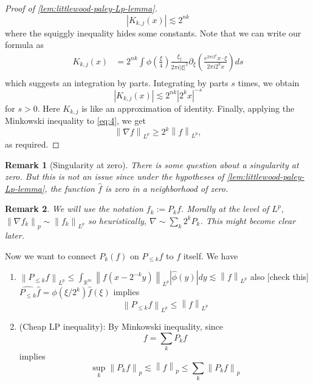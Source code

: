 \documentclass{article}
\def\red{\color{Red}}
\newcommand{\rnote}[1]{{\red [#1] }} %
\newtheorem{remark}{Remark}
\def\R{\mathbb{R}} %
\newcommand\norm[1]{\left\lVert#1\right\rVert}
\begin{document}
\begin{proof}[Proof of \cref{lem:littlewood-paley-Lp-lemma}]
\begin{equation*}
    \left| K_{k,j}(x) \right| \lesssim 2^{nk}
  \end{equation*}
  where the squiggly inequality hides some constants. Note that we can write our
  formula as
  \begin{align*}
    K_{k,j}(x) 
    &=2^{nk} \int \phi \left( \frac{\xi}{4} \right)\frac{\xi_{j}}{2\pi i |\xi|^{2}}\partial_{\xi} \left( \frac{e^{2 \pi i 2^{k}}x\cdot\xi}{2 \pi i 2^{k} x} \right)   ds\\
  \end{align*}
  which suggests an integration by parts. Integrating by parts $s$ times, we obtain
  \begin{equation*}
    \left| K_{k,j}(x) \right| \lesssim 2^{nk} \left| 2^{k}x \right|^{-s}
  \end{equation*}
  for $s>0$. Here $K_{k,j}$ is like an approximation of identity. Finally,
  applying the Minkowski inequality to \cref{eq:4}, we get
  \begin{equation*}
    \norm{\nabla f}_{L^{p}}\geq 2^{k} \norm{f}_{L^{p}},
  \end{equation*}
  as required.
\end{proof}

\begin{remark}[Singularity at zero]
  There is some question about a singularity at zero. But this is not an issue
  since under the hypotheses of \cref{lem:littlewood-paley-Lp-lemma}, the
  function $\hat{f}$ is zero in a neighborhood of zero. 
\end{remark}

\begin{remark}
  We will use the notation $f_{k}:=P_{k}f$. Morally at the level of $L^{p}$,
  $ \norm{\nabla f_{k}}_{p}\sim \norm{f_{k}}_{L^{p}}$ so heuristically,
  $\nabla\sim \sum_{k}2^{k}P_{k}$. This might become clear later.
\end{remark}

Now we want to connect $P_{k}(f)$ on $P_{ \leq k}f$ to $f$ itself. We have
\begin{enumerate}
  \item
  $\norm{P_{ \leq k}f}_{L^{p}}\leq \int_{\R^m} \norm{f(x-2^{-k}y)}_{L^{p}}
  \left| \widehat{\phi}(y) \right|dy \lesssim \norm{f}_{L^{p}}$ also
  \rnote{check this}
  $\widehat{P_{ \leq k}}\widehat{f} = \phi(\xi/2^{k})\hat{f}(\xi)$ implies
  \begin{equation}\label{eq:6}
    \norm{P_{ \leq k}f}_{L^{p}} \leq \norm{f}_{L^{p}}
  \end{equation}
  \item (Cheap LP inequality): By Minkowski inequality, since
  \begin{equation*}
    f= \sum_{k} P_{k}f 
  \end{equation*}
  implies
  \begin{equation*}
    \sup_{k} \norm{P_{k}f}_{p} \lesssim \norm{f}_{p} \leq \sum_{k}\norm{P_{k}f}_{p} 
  \end{equation*}
\end{enumerate}
\end{document}
